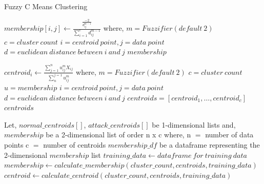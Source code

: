 \documentclass[12pt,a4paper,final]{report}
\begin{document}
\begin{algorithm}
\caption{Fuzzy C Means Clustering}
\begin{algorithmic}[1]
\State $membership[i,j] \leftarrow \frac{\frac{-2}{d_{ij}^{m-1}}}{\sum_{i=1}^{c}{{d_{ij}^{m-1}}}}$
\newline
\hspace*{1cm}
where, 
\newline
\hspace*{1cm}
$m = Fuzzifier (default\ 2)$
\newline
\hspace*{1cm}
$c = cluster\ count$
\newline
\hspace*{1cm}
$i = centroid\ point, j = data\ point$
\newline
\hspace*{1cm}
$d = euclidean\ distance\ between\ i\ and\ j$
\State \Return $membership$
\EndFunction

\State $centroid_{i} \leftarrow \frac{\sum_{j=1}^{n}u_{ij}^{m}X_{ij}}{\sum_{n}^{j=1}u_{ij}^{m}}$
\newline
\hspace*{1cm}
where, 
\newline
\hspace*{1cm}
$m = Fuzzifier (default\ 2)$
\newline
\hspace*{1cm}
$c = cluster\ count$
\newline
\hspace*{1cm}
$u = membership$
\newline
\hspace*{1cm}
$i = centroid\ point, j = data\ point$
\newline
\hspace*{1cm}
$d = euclidean\ distance\ between\ i\ and\ j$
\State $centroids = [ centroid_1, \ldots, centroid_c ]$
\State \Return $centroids$
\EndFunction

\State Let, $normal\_centroids[]$, $attack\_centroids[]$ be 1-dimensional lists and,
\State $ membership $ be a 2-dimensional list of order n x c
\newline
\hspace*{1cm}
where, 
\newline
\hspace*{1cm}
n $=$ number of data points
\newline
\hspace*{1cm}
c $=$ number of centroids
\State $ membership\_df $ be a dataframe representing the 2-dimensional $membership$ list
\State $training\_data \leftarrow dataframe\ for\ training\ data $
\State $membership \leftarrow calculate\_membership(cluster\_count, centroids, training\_data)$
\State $centroid \leftarrow calculate\_centroid(cluster\_count, centroids, training\_data)$


\end{algorithmic}
\end{algorithm}
\end{document}

